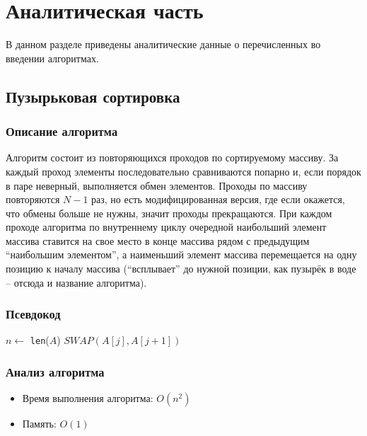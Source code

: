 \chapter{Аналитическая часть}

В данном разделе приведены аналитические данные о перечисленных во введении алгоритмах.

\section{Пузырьковая сортировка}

\subsection{Описание алгоритма}

Алгоритм состоит из повторяющихся проходов по сортируемому массиву.
За каждый проход элементы последовательно сравниваются попарно и, если порядок в паре неверный, выполняется обмен элементов.
Проходы по массиву повторяются $N-1$ раз, но есть модифицированная версия, где если окажется, что обмены больше не нужны, значит проходы прекращаются.
При каждом проходе алгоритма по внутреннему циклу очередной наибольший элемент массива ставится на свое место в конце массива рядом с предыдущим ``наибольшим элементом'', а наименьший элемент массива перемещается на одну позицию к началу массива (``всплывает'' до нужной позиции, как пузырёк в воде -- отсюда и название алгоритма).\cite{levitin-ref}

\subsection{Псевдокод}

\begin{algorithmic}
\State $n \gets$ \texttt{len}($A$)
\State $SWAP(A[j], A[j + 1])$
\EndIf
\EndFor
\EndFor
\EndProcedure
\end{algorithmic}

\subsection{Анализ алгоритма}

\begin{itemize}
    \item Время выполнения алгоритма: $O(n^2)$
    \item Память: $O(1)$
\end{itemize}

